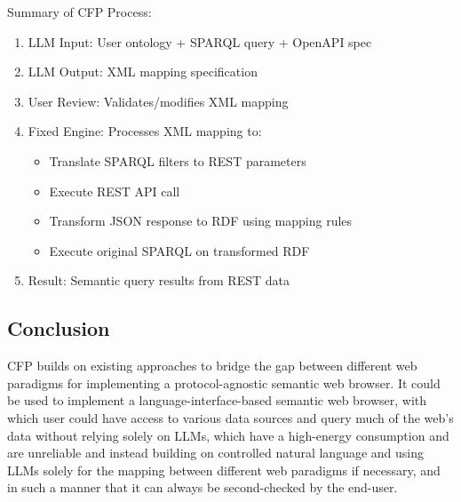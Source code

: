 \documentclass[12pt,a4paper]{article}
\begin{document}
Summary of CFP Process:
\begin{enumerate}
    \item LLM Input: User ontology + SPARQL query + OpenAPI spec
    \item LLM Output: XML mapping specification
    \item User Review: Validates/modifies XML mapping
    \item Fixed Engine: Processes XML mapping to:
    \begin{itemize}
        \item Translate SPARQL filters to REST parameters
        \item Execute REST API call
        \item Transform JSON response to RDF using mapping rules
        \item Execute original SPARQL on transformed RDF
    \end{itemize}
    \item Result: Semantic query results from REST data
\end{enumerate}

\subsection{Conclusion}

CFP builds on existing approaches to bridge the gap between different web paradigms for implementing a protocol-agnostic semantic web browser. It could be used to implement a language-interface-based semantic web browser, with which user could have access to various data sources and query much of the web's data without relying solely on LLMs, which have a high-energy consumption and are unreliable and instead building on controlled natural language and using LLMs solely for the mapping between different web paradigms if necessary, and in such a manner that it can always be second-checked by the end-user.

\printbibliography
\end{document}

